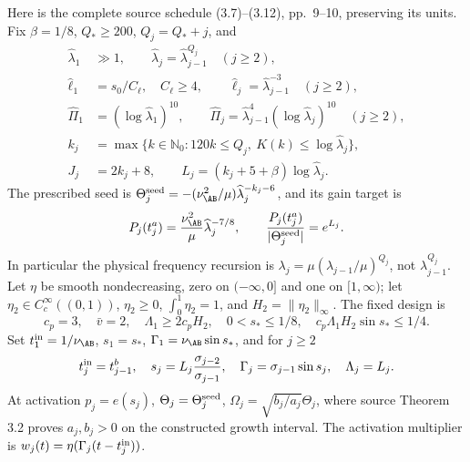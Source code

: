 Here is the complete source schedule (3.7)--(3.12), pp.~9--10, preserving its units. Fix $\beta=1/8$, $Q_*\ge200$, $Q_j=Q_*+j$, and
\begin{align}
 \widehat\lambda_1&\gg1,\qquad\widehat\lambda_j=\widehat\lambda_{j-1}^{Q_j}\quad(j\ge2),\label{cvlane:pc:eq:schedule}\\
 \widehat\ell_1&=s_0/C_\ell,\quad C_\ell\ge4,\qquad\widehat\ell_j=\widehat\lambda_{j-1}^{-3}\quad(j\ge2),\nonumber\\
 \widehat\Pi_1&=(\log\widehat\lambda_1)^{10},\qquad
 \widehat\Pi_j=\widehat\lambda_{j-1}^{4}(\log\widehat\lambda_j)^{10}\quad(j\ge2),\nonumber\\
 k_j&=\max\{k\in\mathbb N_0:120k\le Q_j,\ K(k)\le\log\widehat\lambda_j\},\nonumber\\
 J_j&=2k_j+8,\qquad L_j=(k_j+5+\beta)\log\widehat\lambda_j.\nonumber
\end{align}
The prescribed seed is $\Theta_j^{\rm seed}=-(\nu_{\AB}^2/\mu)\widehat\lambda_j^{-k_j-6}$, and its gain target is
\[
 P_j(t_j^a)=\frac{\nu_{\AB}^2}{\mu}\widehat\lambda_j^{-7/8},
 \qquad \frac{P_j(t_j^a)}{|\Theta_j^{\rm seed}|}=e^{L_j}.
\]
In particular the physical frequency recursion is $\lambda_j=\mu(\lambda_{j-1}/\mu)^{Q_j}$, not $\lambda_{j-1}^{Q_j}$.
Let $\eta$ be smooth nondecreasing, zero on $(-\infty,0]$ and one on $[1,\infty)$; let $\eta_2\in C_c^\infty((0,1))$, $\eta_2\ge0$, $\int_0^1\eta_2=1$, and $H_2=\|\eta_2\|_\infty$. The fixed design is
\[
 c_p=3,\quad\bar v=2,\quad\Lambda_1\ge2c_pH_2,\quad
 0<s_*\le1/8,\quad c_p\Lambda_1H_2\sin s_*\le1/4.
\]
Set $t_1^{\rm in}=1/\nu_{\AB}$, $s_1=s_*$, $\Gamma_1=\nu_{\AB}\sin s_*$, and for $j\ge2$
\[
 t_j^{\rm in}=t_{j-1}^b,\quad s_j=L_j\frac{\sigma_{j-2}}{\sigma_{j-1}},\quad
 \Gamma_j=\sigma_{j-1}\sin s_j,\quad\Lambda_j=L_j.
\]
At activation $p_j=e(s_j)$, $\Theta_j=\Theta_j^{\rm seed}$, $\Omega_j=\sqrt{b_j/a_j}\Theta_j$, where source Theorem 3.2 proves $a_j,b_j>0$ on the constructed growth interval. The activation multiplier is $w_j(t)=\eta(\Gamma_j(t-t_j^{\rm in}))$.
